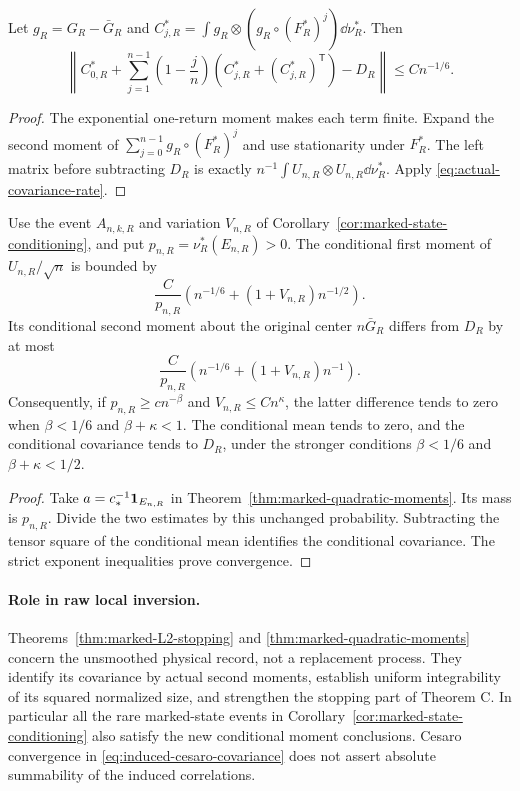 \begin{corollary}
\label{cor:induced-cesaro-covariance}
Let $g_R=G_R-\bar G_R$ and
$C^*_{j,R}=\int g_R\otimes(g_R\circ(F_R^*)^j)\dd\nu_R^*$.
Then
\begin{equation}\label{eq:induced-cesaro-covariance}
 \left\|C^*_{0,R}+\sum_{j=1}^{n-1}\left(1-\frac jn\right)
          (C^*_{j,R}+(C^*_{j,R})^{\mathsf T})-D_R\right\|
       \le C n^{-1/6}.
\end{equation}
\end{corollary}
\begin{proof}
The exponential one-return moment makes each term finite. Expand the
second moment of $\sum_{j=0}^{n-1}g_R\circ(F_R^*)^j$ and use stationarity
under $F_R^*$. The left matrix before subtracting $D_R$ is exactly
$n^{-1}\int U_{n,R}\otimes U_{n,R}\dd\nu_R^*$. Apply
\eqref{eq:actual-covariance-rate}.
\end{proof}

\begin{corollary}
\label{cor:marked-conditional-moments}
Use the event $A_{n,k,R}$ and variation $V_{n,R}$ of
Corollary~\ref{cor:marked-state-conditioning}, and put
$p_{n,R}=\nu_R^*(E_{n,R})>0$. The conditional first moment of
$U_{n,R}/\sqrt n$ is bounded by
\[
 \frac C{p_{n,R}}\left(n^{-1/6}+(1+V_{n,R})n^{-1/2}\right).
\]
Its conditional second moment about the original center $n\bar G_R$
differs from $D_R$ by at most
\[
 \frac C{p_{n,R}}\left(n^{-1/6}+(1+V_{n,R})n^{-1}\right).
\]
Consequently, if $p_{n,R}\ge c n^{-\beta}$ and
$V_{n,R}\le Cn^\kappa$, the latter difference tends to zero when
$\beta<1/6$ and $\beta+\kappa<1$. The conditional mean tends to zero,
and the conditional covariance tends to $D_R$, under the stronger
conditions $\beta<1/6$ and $\beta+\kappa<1/2$.
\end{corollary}
\begin{proof}
Take $a=c_*^{-1}\mathbf1_{E_{n,R}}$ in
Theorem~\ref{thm:marked-quadratic-moments}. Its mass is $p_{n,R}$.
Divide the two estimates by this unchanged probability. Subtracting
the tensor square of the conditional mean identifies the conditional
covariance. The strict exponent inequalities prove convergence.
\end{proof}

\paragraph{Role in raw local inversion.}
Theorems~\ref{thm:marked-L2-stopping} and
\ref{thm:marked-quadratic-moments} concern the unsmoothed physical
record, not a replacement process. They identify its covariance by
actual second moments, establish uniform integrability of its squared
normalized size, and strengthen the stopping part of Theorem C.
In particular all the rare marked-state events in
Corollary~\ref{cor:marked-state-conditioning} also satisfy the new
conditional moment conclusions. Cesaro convergence in
\eqref{eq:induced-cesaro-covariance} does not assert absolute summability
of the induced correlations.

